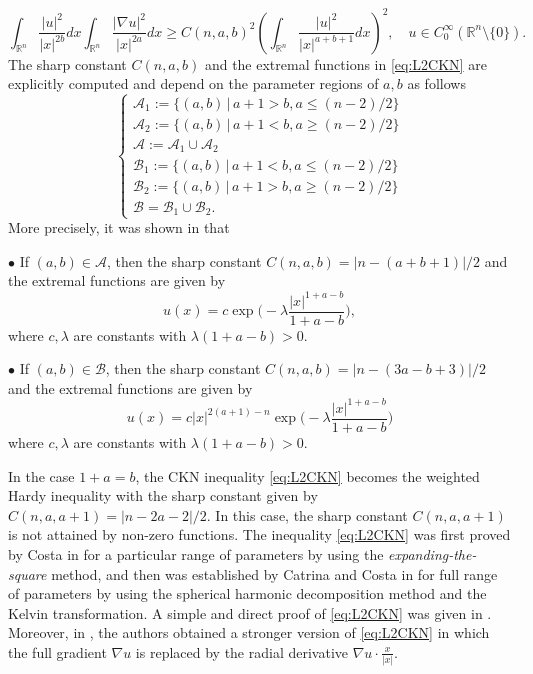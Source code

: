 \documentclass[a4paper,12pt]{article}
\theoremstyle{plain}
\theoremstyle{definition}
\theoremstyle{remark}
\def\R{\mathbb R}%
\def\lt{\left}%
\def\rt{\right}%
\numberwithin{equation}{section}
\begin{document}
\begin{equation}\label{eq:L2CKN}
\int_{\R^n} \frac{|u|^2}{|x|^{2b}} dx \int_{\R^n} \frac{|\nabla u|^2}{|x|^{2a}} dx \geq C(n,a,b)^2\lt(\int_{\R^n} \frac{|u|^2}{|x|^{a+b+1}} dx\rt)^2,\quad u \in C^\infty_0(\R^n\setminus\{0\}).
\end{equation}
The sharp constant $C(n,a,b)$ and the extremal functions in \eqref{eq:L2CKN} are explicitly computed and depend on the parameter regions of $a, b$ as follows
\begin{equation*}%
\begin{cases}
\mathcal A_1 :=\{(a,b)\, |\, a+1 > b, a\leq (n-2)/2\}\\
\mathcal A_2 := \{(a,b)\, |\, a+1 < b, a\geq (n-2)/2\}\\
\mathcal A := \mathcal A_1 \cup \mathcal A_2\\
\mathcal B_1 := \{(a,b)\, |\, a+1 <b, a\leq (n-2)/2\}\\
\mathcal B_2 := \{(a,b)\, |\, a+1 > b, a\geq (n-2)/2\}\\
\mathcal B = \mathcal B_1 \cup \mathcal B_2.
\end{cases}
\end{equation*}
More precisely, it was shown in \cite{CatrinaCosta} that

$\bullet$ If $(a,b) \in \mathcal A$, then the sharp constant $C(n,a,b) = |n -(a+b +1)|/2$ and the extremal functions are given by 
\[
u(x) = c \exp\Big(-\lambda \frac{|x|^{1+a -b}}{1+a-b}\Big),
\]
where $c, \lambda $ are constants with $\lambda (1+a -b) > 0$.

$\bullet$ If $(a,b) \in \mathcal B$, then the sharp constant  $C(n,a,b) = |n -(3a -b +3)|/2$ and the extremal functions are given by 
\[
u(x) = c |x|^{2(a+1) -n}\exp\Big(-\lambda \frac{|x|^{1+a -b}}{1+a-b}\Big)
\]
where $c, \lambda $ are constants with $\lambda (1+a -b) > 0$.

 In the case $1+a = b$, the CKN inequality \eqref{eq:L2CKN} becomes the weighted Hardy inequality with the sharp constant given by $C(n,a,a+1) = |n -2a -2|/2$. In this case, the sharp constant $C(n,a,a+1)$ is not attained by non-zero functions. The inequality \eqref{eq:L2CKN} was first proved by Costa in \cite{Costa} for a particular range of parameters by using the \emph{\text expanding-the-square} method, and then was established by Catrina and Costa in \cite{CatrinaCosta} for full range of parameters by using the spherical harmonic decomposition method and the Kelvin transformation. A simple and direct proof of \eqref{eq:L2CKN} was given in \cite{CaFlyLa}. Moreover, in \cite{CaFlyLa}, the authors obtained a stronger version of \eqref{eq:L2CKN} in which the full gradient $\nabla u$ is replaced by the radial derivative $\nabla u\cdot \frac x{|x|}$.
\end{document}
